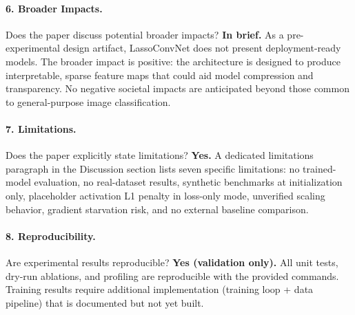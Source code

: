 \documentclass{article}
\begin{document}
\paragraph{6. Broader Impacts.}
Does the paper discuss potential broader impacts?
\textbf{In brief.} As a pre-experimental design artifact, LassoConvNet does
not present deployment-ready models. The broader impact is positive: the
architecture is designed to produce interpretable, sparse feature maps that
could aid model compression and transparency. No negative societal impacts
are anticipated beyond those common to general-purpose image classification.

\paragraph{7. Limitations.}
Does the paper explicitly state limitations?
\textbf{Yes.} A dedicated limitations paragraph in the Discussion section
lists seven specific limitations: no trained-model evaluation, no real-dataset
results, synthetic benchmarks at initialization only, placeholder activation
L1 penalty in loss-only mode, unverified scaling behavior, gradient starvation
risk, and no external baseline comparison.

\paragraph{8. Reproducibility.}
Are experimental results reproducible?
\textbf{Yes (validation only).} All unit tests, dry-run ablations, and
profiling are reproducible with the provided commands. Training results
require additional implementation (training loop + data pipeline) that is
documented but not yet built.
\end{document}
